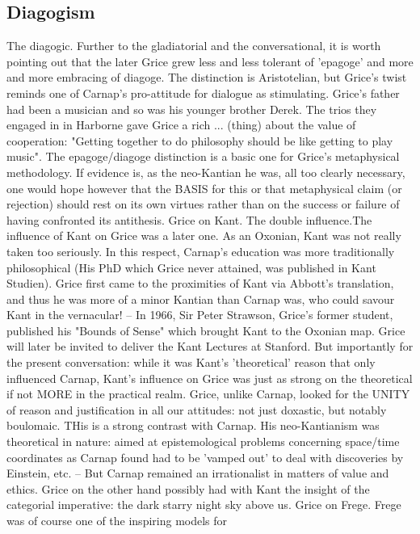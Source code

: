 \documentclass[10pt,titlepage]{book}
\begin{document}
\subsection{Diagogism}

The  diagogic. Further to the gladiatorial and the 
conversational, it is  worth  pointing out that the later Grice grew less and less 
tolerant of 'epagoge'   and more and more embracing of diagoge. The distinction is 
Aristotelian,  but  Grice's twist reminds one of Carnap's pro-attitude for 
dialogue  as   stimulating. Grice's  father had been a musician and so was 
his younger brother Derek.  The trios  they engaged in in Harborne gave Grice 
a rich ... (thing) about the value of  cooperation: "Getting together to do 
philosophy should be like getting  to  play music". The epagoge/diagoge 
distinction is a basic one for Grice's  metaphysical  methodology. If evidence 
is, as the neo-Kantian he was, all  too clearly  
necessary, one would hope however that the BASIS for this  or that 
metaphysical  claim (or rejection) should rest on its own virtues  rather than on 
the success  or failure of having confronted its  antithesis. 
Grice  on Kant. The  double influence.The influence of Kant on Grice was a 
later one. As an Oxonian,  Kant was not really taken too seriously. In this 
respect, Carnap's education was  more traditionally philosophical (His PhD 
which Grice never attained, was  published in Kant Studien). Grice first came 
to the proximities of Kant via  Abbott's translation, and thus he was more 
of a minor Kantian than Carnap was,  who could savour Kant in the 
vernacular! -- In 1966, Sir Peter Strawson, Grice's  former student, published his 
"Bounds of Sense" which brought Kant to the  Oxonian map. Grice will later be 
invited to deliver the Kant Lectures at  Stanford. But  importantly for the 
present conversation: while it was Kant's 'theoretical'  reason that only 
influenced Carnap, Kant's influence on Grice was just as strong  on the 
theoretical if not MORE in the practical realm. Grice, unlike  Carnap, looked for 
the UNITY of reason and justification in all  our attitudes: not just 
doxastic, but notably boulomaic. THis is a strong  contrast with Carnap. His 
neo-Kantianism was theoretical in nature: aimed at  epistemological problems 
concerning space/time coordinates as Carnap  found had to be 'vamped out' to deal 
with discoveries by Einstein, etc.  -- But Carnap remained an irrationalist 
in matters of value and  ethics. Grice on the other hand possibly had with 
Kant the insight of the  categorial imperative: the dark starry night sky 
above us. 
Grice  on Frege. Frege was of course one of the inspiring models for 
\end{document}
